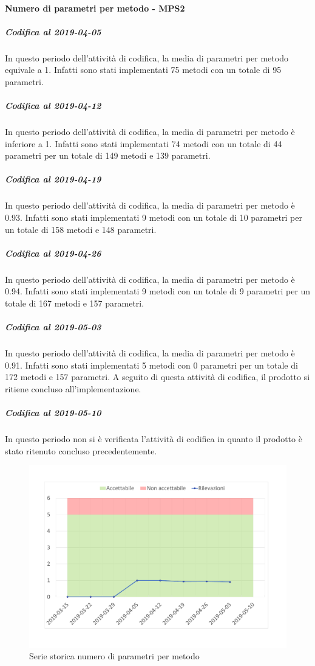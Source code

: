 \paragraph{Numero di parametri per metodo - MPS2}
\subparagraph{Codifica al 2019-04-05}
In questo periodo dell'attività di codifica, la media di parametri per metodo equivale a 1. Infatti sono stati implementati 75 metodi con un totale di 95 parametri.

\subparagraph{Codifica al 2019-04-12}
In questo periodo dell'attività di codifica, la media di parametri per metodo è inferiore a 1. Infatti sono stati implementati 74 metodi con un totale di 44 parametri per un totale di 149 metodi e 139 parametri.

\subparagraph{Codifica al 2019-04-19}
In questo periodo dell'attività di codifica, la media di parametri per metodo è 0.93. Infatti sono stati implementati 9 metodi con un totale di 10 parametri per un totale di 158 metodi e 148 parametri.

\subparagraph{Codifica al 2019-04-26}
In questo periodo dell'attività di codifica, la media di parametri per metodo è 0.94. Infatti sono stati implementati 9 metodi con un totale di 9 parametri per un totale di 167 metodi e 157 parametri.

\subparagraph{Codifica al 2019-05-03}
In questo periodo dell'attività di codifica, la media di parametri per metodo è 0.91. Infatti sono stati implementati 5 metodi con 0 parametri per un totale di 172 metodi e 157 parametri. 
A seguito di questa attività di codifica, il prodotto si ritiene concluso all'implementazione.

\subparagraph{Codifica al 2019-05-10}
In questo periodo non si è verificata l'attività di codifica in quanto il prodotto è stato ritenuto concluso precedentemente.
\\
\begin{figure}[H]
	\centering
	\includegraphics[scale=0.6]{images/resoconto/MPS2Chart.pdf}
	\caption{Serie storica numero di parametri per metodo}	
\end{figure}

